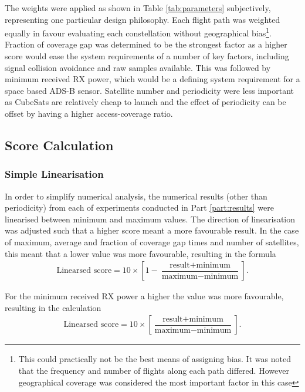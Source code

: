 The weights were applied as shown in Table \ref{tab:parameters} subjectively, representing one particular design philosophy. Each flight path was weighted equally in favour evaluating each constellation without geographical bias\footnote{This could practically not be the best means of assigning bias. It was noted that the frequency and number of flights along each path differed. However geographical coverage was considered the most important factor in this case}. Fraction of coverage gap was determined to be the strongest factor as a higher score would ease the system requirements of a number of key factors, including signal collision avoidance and raw samples available. This was followed by minimum received RX power, which would be a defining system requirement for a space based ADS-B sensor. Satellite number and periodicity were less important as CubeSats are relatively cheap to launch and the effect of periodicity can be offset by having a higher access-coverage ratio. 

\subsection{Score Calculation}
  
\subsubsection{Simple Linearisation}
In order to simplify numerical analysis, the numerical results (other than periodicity) from each of experiments conducted in Part \ref{part:results} were linearised between minimum and maximum values. The direction of linearisation was adjusted such that a higher score meant a more favourable result. In the case of maximum, average and fraction of coverage gap times and number of satellites, this meant that a lower value was more favourable, resulting in the formula
\begin{align}
	\text{Linearsed score} = 10 \times \left[1 - \dfrac{\text{result} + \text{minimum}}{\text{maximum} - \text{minimum}}\right]. \label{eqn:linearisation}
\end{align}

For the minimum received RX power a higher the value was more favourable, resulting in the calculation 
\begin{align}
	\text{Linearsed score} = 10 \times \left[\dfrac{\text{result} + \text{minimum}}{\text{maximum} - \text{minimum}}\right]. \label{eqn:linearisation_up}
\end{align}

